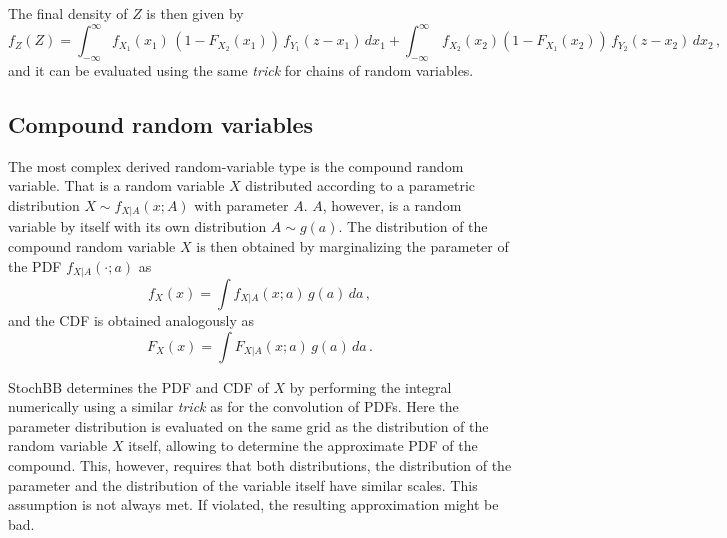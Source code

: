 The final density of $Z$ is then given by
\begin{equation}
 f_Z(Z) = \int_{-\infty}^\infty f_{X_1}(x_1)\,\left(1-F_{X_2}(x_1)\right)\,f_{Y_1}(z-x_1)\,dx_1
  + \int_{-\infty}^\infty \,f_{X_2}(x_2)\left(1-F_{X_1}(x_2)\right)\,f_{Y_2}(z-x_2)\,dx_2\,, \nonumber
\end{equation}
and it can be evaluated using the same \emph{trick} for chains of random variables.

\subsection{Compound random variables}
The most complex derived random-variable type is the compound random variable. That is a random variable
$X$ distributed according to a parametric distribution $X\sim f_{X|A}(x;A)$ with parameter $A$. $A$, however, 
is a random variable by itself with its own distribution $A\sim g(a)$. The distribution of the compound 
random variable $X$ is then obtained by marginalizing the parameter of the PDF $f_{X|A}(\cdot;a)$ as 
\begin{equation}
 f_X(x) = \int f_{X|A}(x;a)\,g(a)\,da\,,\nonumber
\end{equation}
and the CDF is obtained analogously as
\begin{equation}
 F_X(x) = \int F_{X|A}(x;a)\,g(a)\,da\,.\nonumber
\end{equation}

StochBB determines the PDF and CDF of $X$ by performing the integral numerically using a similar \emph{trick}
as for the convolution of PDFs. Here the parameter distribution is evaluated on the same grid as the distribution
of the random variable $X$ itself, allowing to determine the approximate PDF of the compound. This, however, requires 
that both distributions, the distribution of the parameter and the distribution of the variable itself have similar 
scales. This assumption is not always met. If violated, the resulting approximation might be bad.

